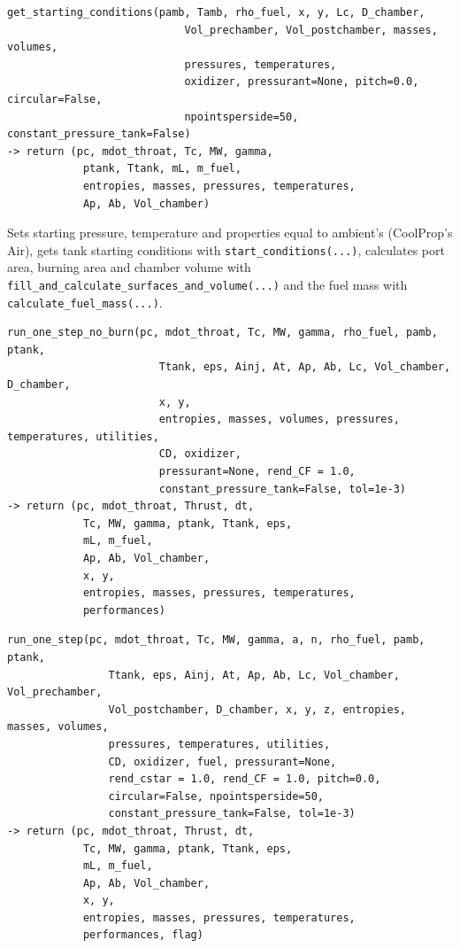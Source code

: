 \begin{verbatim}
get_starting_conditions(pamb, Tamb, rho_fuel, x, y, Lc, D_chamber, 
							Vol_prechamber, Vol_postchamber, masses, volumes, 
							pressures, temperatures, 
							oxidizer, pressurant=None, pitch=0.0, circular=False, 
							npointsperside=50, constant_pressure_tank=False)
-> return (pc, mdot_throat, Tc, MW, gamma,
            ptank, Ttank, mL, m_fuel,
            entropies, masses, pressures, temperatures,
            Ap, Ab, Vol_chamber)
\end{verbatim}
\hspace{2em} Sets starting pressure, temperature and properties equal to ambient's (CoolProp's Air), gets tank starting conditions with \verb|start_conditions(...)|, calculates port area, burning area and chamber volume with \verb|fill_and_calculate_surfaces_and_volume(...)| and the fuel mass with \verb|calculate_fuel_mass(...)|.

\begin{verbatim}
run_one_step_no_burn(pc, mdot_throat, Tc, MW, gamma, rho_fuel, pamb, ptank, 
						Ttank, eps, Ainj, At, Ap, Ab, Lc, Vol_chamber, D_chamber, 
						x, y, 
						entropies, masses, volumes, pressures, temperatures, utilities, 
						CD, oxidizer,
						pressurant=None, rend_CF = 1.0, 
						constant_pressure_tank=False, tol=1e-3)
-> return (pc, mdot_throat, Thrust, dt,
            Tc, MW, gamma, ptank, Ttank, eps,
            mL, m_fuel,
            Ap, Ab, Vol_chamber,
            x, y,
            entropies, masses, pressures, temperatures,
            performances)
\end{verbatim}

\begin{verbatim}
run_one_step(pc, mdot_throat, Tc, MW, gamma, a, n, rho_fuel, pamb, ptank, 
				Ttank, eps, Ainj, At, Ap, Ab, Lc, Vol_chamber, Vol_prechamber, 
				Vol_postchamber, D_chamber, x, y, z, entropies, masses, volumes, 
				pressures, temperatures, utilities,
				CD, oxidizer, fuel, pressurant=None, 
				rend_cstar = 1.0, rend_CF = 1.0, pitch=0.0,
				circular=False, npointsperside=50, 
				constant_pressure_tank=False, tol=1e-3)
-> return (pc, mdot_throat, Thrust, dt,
            Tc, MW, gamma, ptank, Ttank, eps,
            mL, m_fuel,
            Ap, Ab, Vol_chamber,
            x, y,
            entropies, masses, pressures, temperatures,
            performances, flag)
\end{verbatim}

